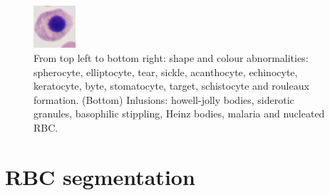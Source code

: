 \documentclass[final,a4paper,12pt,english]{UnicaPhdThesis3}
\begin{document}
{\begin{figure}[h]
	\includegraphics[width=0.14\textwidth]{images/2016_2_sitis/nucleated}\hspace{-1mm}
	\caption{\label{fig:RBCs} From top left to bottom right: shape and colour abnormalities: spherocyte, elliptocyte, tear, sickle, acanthocyte, echinocyte, keratocyte, byte, stomatocyte, target, schistocyte and rouleaux formation. (Bottom) Inlusions: howell-jolly bodies, siderotic granules, basophilic stippling, Heinz bodies, malaria and nucleated RBC.}
\end{figure}

\section{RBC segmentation}
\label{mva}

}
\end{document}

